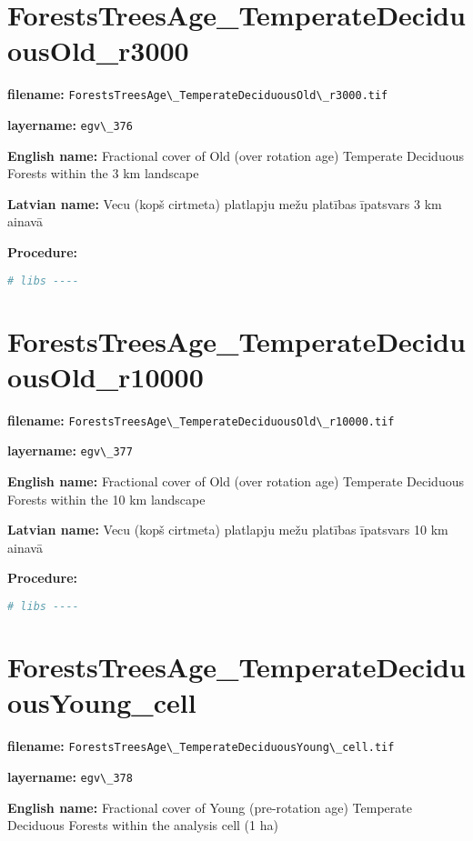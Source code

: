 \documentclass[
]{book}
\newcommand{\passthrough}[1]{#1}
\begin{document}
\section{ForestsTreesAge\_TemperateDeciduousOld\_r3000}\label{ch06.376}

\textbf{filename:} \passthrough{\lstinline!ForestsTreesAge\_TemperateDeciduousOld\_r3000.tif!}

\textbf{layername:} \passthrough{\lstinline!egv\_376!}

\textbf{English name:} Fractional cover of Old (over rotation age) Temperate Deciduous Forests within the 3 km landscape

\textbf{Latvian name:} Vecu (kopš cirtmeta) platlapju mežu platības īpatsvars 3 km ainavā

\textbf{Procedure:}

\begin{lstlisting}[language=R]
# libs ----
\end{lstlisting}

\section{ForestsTreesAge\_TemperateDeciduousOld\_r10000}\label{ch06.377}

\textbf{filename:} \passthrough{\lstinline!ForestsTreesAge\_TemperateDeciduousOld\_r10000.tif!}

\textbf{layername:} \passthrough{\lstinline!egv\_377!}

\textbf{English name:} Fractional cover of Old (over rotation age) Temperate Deciduous Forests within the 10 km landscape

\textbf{Latvian name:} Vecu (kopš cirtmeta) platlapju mežu platības īpatsvars 10 km ainavā

\textbf{Procedure:}

\begin{lstlisting}[language=R]
# libs ----
\end{lstlisting}

\section{ForestsTreesAge\_TemperateDeciduousYoung\_cell}\label{ch06.378}

\textbf{filename:} \passthrough{\lstinline!ForestsTreesAge\_TemperateDeciduousYoung\_cell.tif!}

\textbf{layername:} \passthrough{\lstinline!egv\_378!}

\textbf{English name:} Fractional cover of Young (pre-rotation age) Temperate Deciduous Forests within the analysis cell (1 ha)
\end{document}
